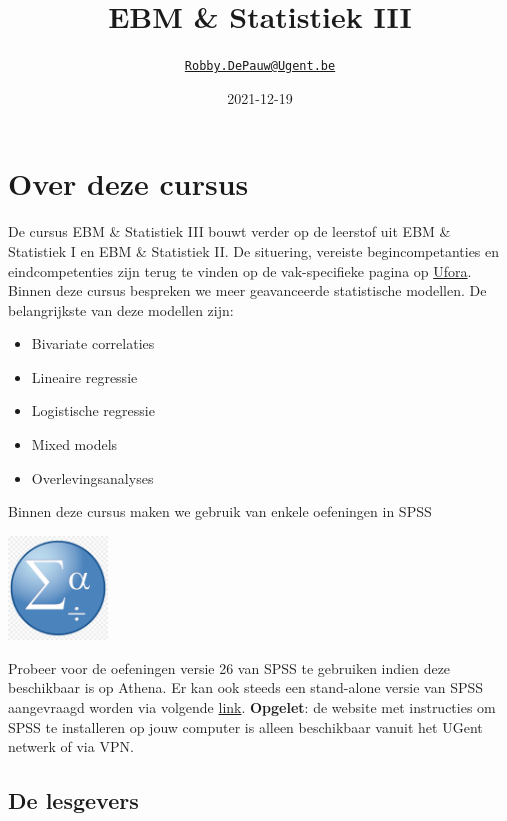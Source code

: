 \documentclass[
]{book}
\title{EBM \& Statistiek III}
\author{\href{mailto:Robby.DePauw@Ugent.be}{\nolinkurl{Robby.DePauw@Ugent.be}}}
\date{2021-12-19}
\providecommand{\tightlist}{%
  \setlength{\itemsep}{0pt}\setlength{\parskip}{0pt}}
\theoremstyle{definition}
\theoremstyle{definition}
\theoremstyle{definition}
\theoremstyle{definition}
\theoremstyle{remark}
\begin{document}
\maketitle

{
\setcounter{tocdepth}{2}
\tableofcontents
}
\hypertarget{over-deze-cursus}{%
\chapter*{Over deze cursus}\label{over-deze-cursus}}


De cursus {EBM \& Statistiek III} bouwt verder op de leerstof uit {EBM \& Statistiek I} en {EBM \& Statistiek II}. De situering, vereiste begincompetanties en eindcompetenties zijn terug te vinden op de vak-specifieke pagina op \href{https://ufora.ugent.be}{Ufora}. Binnen deze cursus bespreken we meer geavanceerde statistische modellen. De belangrijkste van deze modellen zijn:

\begin{itemize}
\tightlist
\item
  Bivariate correlaties
\item
  Lineaire regressie
\item
  Logistische regressie
\item
  Mixed models
\item
  Overlevingsanalyses
\end{itemize}

Binnen deze cursus maken we gebruik van enkele oefeningen in {SPSS}

\includegraphics[width=1.04167in,height=\textheight]{img/spss.png}

Probeer voor de oefeningen versie 26 van {SPSS} te gebruiken indien deze beschikbaar is op Athena. Er kan ook steeds een stand-alone versie van {SPSS} aangevraagd worden via volgende \href{https://helpdesk.ugent.be/athena/}{link}. \textbf{Opgelet}: de website met instructies om {SPSS} te installeren op jouw computer is alleen beschikbaar vanuit het UGent netwerk of via VPN.

\hypertarget{de-lesgevers}{%
\section*{De lesgevers}\label{de-lesgevers}}
\end{document}

